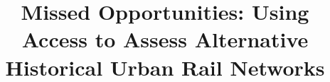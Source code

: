 \documentclass[preprint,12pt,authoryear]{elsarticle}
\begin{document}
\begin{frontmatter}



\title{Missed Opportunities: Using Access to Assess Alternative Historical Urban Rail Networks} %





\end{frontmatter}
\end{document}
